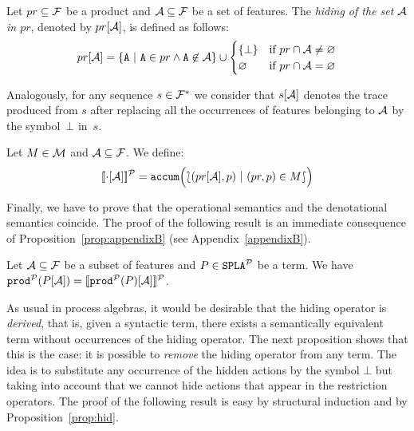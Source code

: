 \bdfn
  Let $pr\subseteq{\cal F}$ be a product and ${\cal A}\subseteq{\cal F}$
  be a set of features. The \emph{hiding of the set ${\cal A}$
    in $pr$}, denoted by $pr[{\cal A}]$, is defined as follows:
  \begin{displaymath}
    pr\hide{\calA} = \{\fA\ |\ \fA\in pr\wedge
    \fA\not\in\calA\}\cup
    \begin{cases}
      \{\bot\} & \mbox{if } pr\cap\calA\neq\emptyset\\
      \emptyset & \mbox{if } pr\cap\calA=\emptyset\\
    \end{cases}
  \end{displaymath}

  Analogously, for any sequence $s\in{\cal F}^{*}$ we consider that $s[{\cal A}]$ denotes the
  trace produced from $s$ after replacing all the occurrences of features belonging to ${\cal A}$ by the symbol~$\bot$ in~$s$.
\edfn

\bdfn
  Let $M\in{\cal M}$ and ${\cal A}\subseteq{\cal F}$. We define:
  \begin{displaymath}
    [\![\cdot[{\cal A}]]\!]^{\cal P} = \mathtt{accum}\Bigl(\lbag(pr[{\cal A}],p)\
    |\ (pr,p)\in M\rbag \Bigr)
  \end{displaymath}
\edfn

Finally, we have to prove that the
operational semantics and the denotational semantics coincide.
%
The proof of the following result is an immediate consequence of Proposition~\ref{prop:appendixB} (see Appendix~\ref{appendixB}).

\bprop\label{prop:hid}Let ${\cal A}\subseteq {\cal F}$ be a subset of features and
  $P\in\mathtt{SPLA{^{\cal P}}}$ be a term. We have $ \mathtt{prod}^{\cal P}(P[{\cal A}])  = [\![\mathtt{prod}^{\cal P}(P)[{\cal A}]]\!]^{\cal P}$.
\eprop

As usual in process algebras, it would be desirable that the hiding operator is \emph{derived}, that is, given a syntactic term, there exists a semantically equivalent term without occurrences of the hiding operator.
The next proposition shows that this is the case: it is possible to \emph{remove} the hiding
operator from any term. The idea is to substitute any occurrence of
the hidden actions by the symbol $\bot$ but taking into account  that we cannot
hide actions that appear in the restriction operators. The proof of the following result is easy by structural induction and by Proposition~\ref{prop:hid}.


